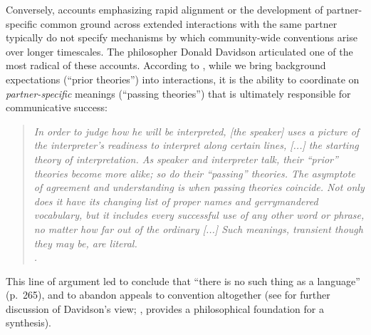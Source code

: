 Conversely, accounts emphasizing rapid alignment \cite{pickering2004toward} or the development of partner-specific common ground \cite{ClarkMarshall1981,ClarkWilkesGibbs86_ReferringCollaborative} across extended interactions with the same partner typically do not specify mechanisms by which community-wide conventions arise over longer timescales.
The philosopher Donald Davidson articulated one of the most radical of these accounts.
According to , while we bring background expectations (``prior theories'') into interactions, it is the ability to coordinate on \emph{partner-specific} meanings (``passing theories'') that is ultimately responsible for communicative success: 
\begin{quote}
\footnotesize\emph{In order to judge how he will be interpreted, [the speaker] uses a picture of the interpreter’s readiness to interpret along certain lines, [...] the starting theory of interpretation. %
As speaker and interpreter talk, their ``prior'' theories become more alike; so do their ``passing'' theories. 
The asymptote of agreement and understanding is when passing theories coincide. 
Not only does it have its changing list of proper names and gerrymandered vocabulary, but it includes every successful use of any other word or phrase, no matter how far out of the ordinary [...] 
Such meanings, transient though they may be, are literal. \\\cite[p.~261]{davidson_nice_1986}.}
\end{quote}
This line of argument led  to conclude that ``there is no such thing as a language'' (p.~265), and to abandon appeals to convention altogether (see  for further discussion of Davidson's view; , provides a philosophical foundation for a synthesis).%


